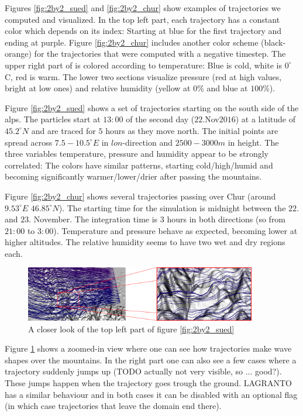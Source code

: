 
Figures \ref{fig:2by2_sued} and \ref{fig:2by2_chur} show examples of trajectories we computed and visualized. In the top left part, each trajectory has a constant color which depends on its index: Starting at blue for the first trajectory and ending at purple. Figure \ref{fig:2by2_chur} includes another color scheme (black-orange) for the trajectories that were computed with a negative timestep. The upper right part of is colored according to temperature: Blue is cold, white is $0^{\circ}$C, red is warm. The lower two sections visualize pressure (red at high values, bright at low ones) and relative humidity (yellow at $0 \%$ and blue at $100 \%$).

Figure \ref{fig:2by2_sued} shows a set of trajectories starting on the south side of the alps. The particles start at $13:00$ of the second day ($22. $Nov$ 2016$) at a latitude of $45.2 ^{\circ} N$ and are traced for $5$ hours as they move north. The initial points are spread across $7.5 - 10.5 ^{\circ} E$ in $lon$-direction and $2500 - 3000 m$ in height. The three variables temperature, pressure and humidity appear to be strongly correlated: The colors have similar patterns, starting cold/high/humid and becoming significantly warmer/lower/drier after passing the mountains.

Figure \ref{fig:2by2_chur} shows several trajectories passing over Chur (around $9.53 ^{\circ}E$ $46.85^{\circ} N$). The starting time for the simulation is midnight between the $22.$ and $23.$ November. The integration time is $3$ hours in both directions (so from $21:00$ to $3:00$). Temperature and pressure behave as expected, becoming lower at higher altitudes. The relative humidity seems to have two wet and dry regions each.

\begin{figure}
\centering \includegraphics*[width=0.9\textwidth]{figures/0627_zooming}
\caption{A closer look of the top left part of figure \ref{fig:2by2_sued}}
\label{fig:zooming}
\end{figure}
Figure \ref{fig:zooming} shows a zoomed-in view where one can see how trajectories make wave shapes over the mountains. In the right part one can also see a few cases where a trajectory suddenly jumps up (TODO actually not very visible, so ... good?). These jumps happen when the trajectory goes trough the ground. LAGRANTO has a similar behaviour and in both cases it can be disabled with an optional flag (in which case trajectories that leave the domain end there).

